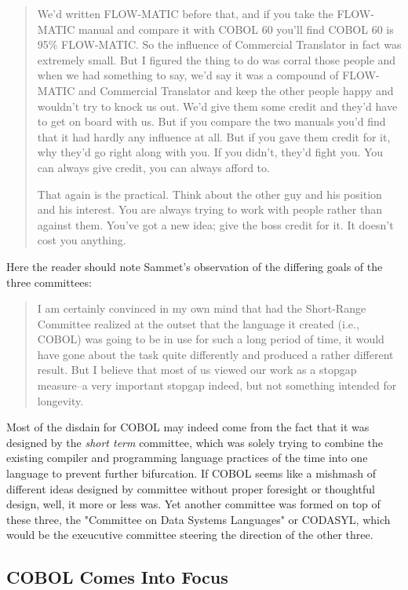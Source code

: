 \begin{quotation}
	We'd written FLOW-MATIC before that, and if you take the FLOW-MATIC
	manual and compare it with COBOL 60 you'll find COBOL 60 is 95\% FLOW-MATIC. So the
	influence of Commercial Translator in fact was extremely small. But I figured the thing to do was
	corral those people and when we had something to say, we'd say it was a compound of FLOW-MATIC
	and Commercial Translator and keep the other people happy and wouldn't try to knock
	us out. We'd give them some credit and they'd have to get on board with us. But if you compare
	the two manuals you'd find that it had hardly any influence at all. But if you gave them credit for
	it, why they'd go right along with you. If you didn't, they'd fight you. You can always give credit,
	you can always afford to.

	That again is the practical. Think about the other guy and his position and his interest. You are
	always trying to work with people rather than against them. You've got a new idea; give the
	boss credit for it. It doesn't cost you anything.
\end{quotation}

Here the reader should note Sammet's observation of the differing goals of the three committees:

\begin{quotation}
	I am certainly convinced in my own mind that had the Short-Range Committee
	realized at the outset that the language it created (i.e., COBOL) was going to
	be in use for such a long period of time, it would have gone about the task
	quite differently and produced a rather different result. But I believe that
	most of us viewed our work as a stopgap measure--a very important stopgap
	indeed, but not something intended for longevity.
\end{quotation}

Most of the disdain for COBOL may indeed come from the fact that it was designed by the \textit{short term}
committee, which was solely trying to combine the existing compiler and programming language practices
of the time into one language to prevent further bifurcation.
If COBOL seems like a mishmash of different ideas designed by committee without proper
foresight or thoughtful design, well, it more or less was.
Yet another committee was formed on top of these three, the "Committee on Data Systems Languages"
or CODASYL, which would be the exeucutive committee steering the direction of the other three.

\subsection{COBOL Comes Into Focus}

